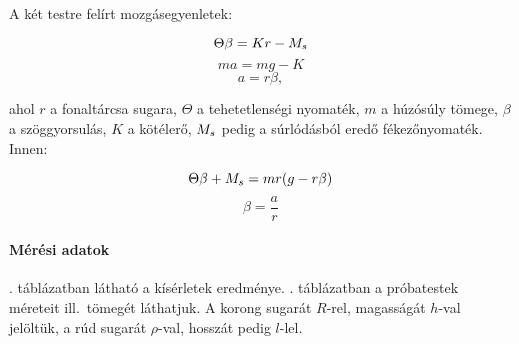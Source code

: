 \documentclass[10pt]{article}
\begin{document}
A két testre felírt mozgásegyenletek:

\[
\Theta\beta=Kr-M_s \\
\]
\[
ma=mg-K
\]
\[
a=r\beta,
\]

ahol $r$ a fonaltárcsa sugara, $\Theta$ a tehetetlenségi nyomaték, $m$ a húzósúly tömege, $\beta$ a szöggyorsulás, $K$ a kötélerő, $M_s$ pedig a súrlódásból eredő fékezőnyomaték.
Innen:

\[
\begin{equation}
\Theta\beta + \Ms = mr(g-r\beta)
\label{eq:egyenes}
\end{equation}
\]
\[
\beta=\frac ar
\]


\paragraph*{Mérési adatok}

. táblázatban látható a kísérletek eredménye. . táblázatban a próbatestek méreteit ill.\ tömegét láthatjuk. A korong sugarát $R$-rel, magasságát $h$-val jelöltük, a rúd sugarát $\rho$-val, hosszát pedig $l$-lel.
\end{document}

